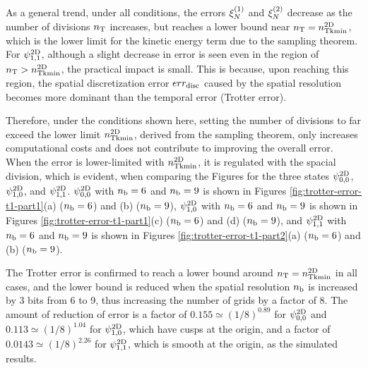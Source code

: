 \documentclass[aip-draft.tex]{subfiles}
\begin{document}
As a general trend, under all conditions, the errors $\xi_{N}^{(1)}$ and $\xi_{N}^{(2)}$
decrease as the number of divisions $n_{\mathrm{T}}$ increases, but reaches a lower bound
near $n_{\mathrm{T}} = n_{\mathrm{Tkmin}}^{\mathrm{2D}}$, which is the lower limit for the kinetic energy term due to the
sampling theorem. For $\psi^{\mathrm{2D}}_{1,1}$, although a slight decrease in error is
seen even in the region of $n_{\mathrm{T}} > n_{\mathrm{Tkmin}}^{\mathrm{2D}}$, the practical impact is small.
This is because, upon reaching this region, the spatial discretization error
$err_{\mathrm{disc}}$ caused by the spatial resolution becomes more dominant than the
temporal error (Trotter error).

Therefore, under the conditions shown here, setting the
number of divisions to far exceed the lower limit $n_{\mathrm{Tkmin}}^{\mathrm{2D}}$, derived from
the sampling theorem, only increases computational costs and does not contribute
to improving the overall error. When the error is lower-limited with
$n_{\mathrm{Tkmin}}^{\mathrm{2D}}$, it is regulated with the spacial division, which is evident, when
comparing the Figures for the three states $\psi^{\mathrm{2D}}_{0,0}$, $\psi^{\mathrm{2D}}_{1,0}$, and
$\psi^{\mathrm{2D}}_{1,1}$. $\psi^{\mathrm{2D}}_{0,0}$ with $n_{\mathrm{b}}=6$ and $n_{\mathrm{b}}=9$ is shown in Figures
\ref{fig:trotter-error-t1-part1}(a) ($n_{\mathrm{b}}=6$) and (b) ($n_{\mathrm{b}}=9$),
$\psi^{\mathrm{2D}}_{1,0}$ with $n_{\mathrm{b}}=6$ and $n_{\mathrm{b}}=9$ is shown in Figures
\ref{fig:trotter-error-t1-part1}(c) ($n_{\mathrm{b}}=6$) and (d) ($n_{\mathrm{b}}=9$), and
$\psi^{\mathrm{2D}}_{1,1}$ with $n_{\mathrm{b}}=6$ and $n_{\mathrm{b}}=9$ is shown in Figures
\ref{fig:trotter-error-t1-part2}(a) ($n_{\mathrm{b}}=6$) and (b) ($n_{\mathrm{b}}=9$).

The Trotter error is confirmed to reach a lower bound around $n_{\mathrm{T}} = n_{\mathrm{Tkmin}}^{\mathrm{2D}}$ in all cases, and
the lower bound is reduced when the spatial resolution $n_{\mathrm{b}}$ is increased by 3 bits
from 6 to 9, thus increasing the number of grids by a factor of 8.  The amount
of reduction of error is a factor of $0.155\simeq(1/8)^{0.89}$ for
$\psi^{\mathrm{2D}}_{0,0}$ and $0.113\simeq(1/8)^{1.04}$ for $\psi^{\mathrm{2D}}_{1,0}$, which have
cusps at the origin, and a factor of $0.0143\simeq(1/8)^{2.26}$ for
$\psi^{\mathrm{2D}}_{1,1}$, which is smooth at the origin, as the simulated results.
\end{document}
